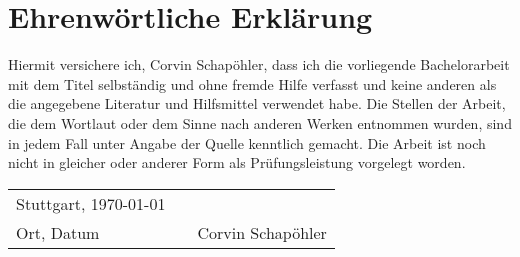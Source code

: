 \chapter{Ehrenwörtliche Erklärung}
Hiermit versichere ich, Corvin Schapöhler, dass ich die vorliegende Bachelorarbeit mit dem Titel \glqq \thetitle\grqq{} selbständig und ohne fremde Hilfe verfasst und keine anderen als die angegebene Literatur und Hilfsmittel verwendet habe. Die Stellen der Arbeit, die dem Wortlaut oder dem Sinne nach anderen Werken entnommen wurden, sind in jedem Fall unter Angabe der Quelle kenntlich gemacht. Die Arbeit ist noch nicht in gleicher oder anderer Form als Prüfungsleistung vorgelegt worden.
\vspace{2cm}

\begin{center}
	\begin{tabular}[h]{lp{2cm}p{5.5cm}}
		Stuttgart, \today & & \\
		\cline{1-1}\cline{3-3}
		Ort, Datum& & Corvin Schapöhler\\
	\end{tabular}
\end{center}
